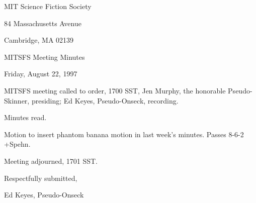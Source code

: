 \documentclass[12pt]{article}
\begin{document}
\begin{center}

MIT Science Fiction Society 

84 Massachusetts Avenue

Cambridge, MA 02139

\vspace{12pt}

MITSFS Meeting Minutes 

Friday, August 22, 1997

\end{center}
 
\vspace{18pt}

\setlength{\parskip}{6pt}

\noindent
MITSFS meeting called to order, 1700 SST,
Jen Murphy, the honorable Pseudo-Skinner, presiding; Ed Keyes, Pseudo-Onseck, recording.

Minutes read.

Motion to insert phantom banana motion in last week's minutes. Passes 8-6-2 +Spehn.

\vspace{12pt}

\noindent
Meeting adjourned, 1701 SST.

\vspace{18pt}

\centerline{Respectfully submitted,}
\centerline{Ed Keyes, Pseudo-Onseck}
\end{document}
